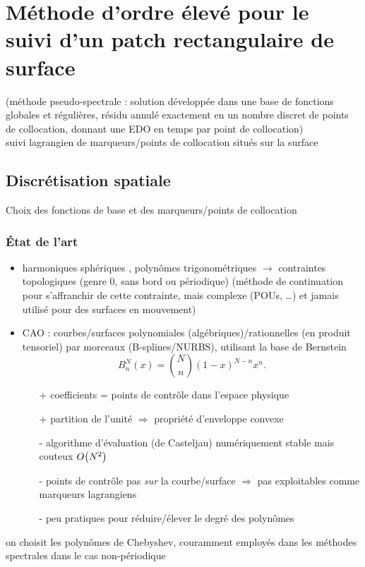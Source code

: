 \chapter{Méthode d'ordre élevé pour le suivi d'un patch rectangulaire de surface}

(méthode pseudo-spectrale : solution développée dans une base de fonctions globales et régulières, résidu annulé exactement en un nombre discret de points de collocation, donnant une EDO en temps par point de collocation)\\

suivi lagrangien de marqueurs/points de collocation situés sur la surface\\
\cite{peternell1997}

\section{Discrétisation spatiale}

Choix des fonctions de base et des marqueurs/points de collocation\\
\subsection{État de l'art}
\begin{itemize}
	\item harmoniques sphériques \cite{veerapaneni2011}, polynômes trigonométriques \cite{gueyffier2015} $\to$ contraintes topologiques (genre 0, sans bord ou périodique) (méthode de continuation \cite{bruno2007} pour s'affranchir de cette contrainte, mais complexe (POUs, \ldots) et jamais utilisé pour des surfaces en mouvement)
	\item CAO : courbes/surfaces polynomiales (algébriques)/rationnelles (en produit tensoriel) par morceaux (B-splines/NURBS), utilisant la base de Bernstein
	\begin{equation}
		B_n^N(x) = \binom{N}{n} \left( 1 - x \right)^{N-n} x^n.
	\end{equation}
	\begin{itemize}
		\item[+] coefficients = points de contrôle dans l'espace physique
		\item[+] partition de l'unité $\Rightarrow$ propriété d'enveloppe convexe
		\item[-] algorithme d'évaluation (de Casteljau) numériquement stable mais couteux $O\!\left( {N^2} \right)$
		\item[-] points de contrôle pas \emph{sur} la courbe/surface $\Rightarrow$ pas exploitables comme marqueurs lagrangiens
		\item[-] peu pratiques pour réduire/élever le degré des polynômes
	\end{itemize}
\end{itemize}
\bigskip
on choisit les polynômes de Chebyshev, couramment employés dans les méthodes spectrales dans le cas non-périodique
